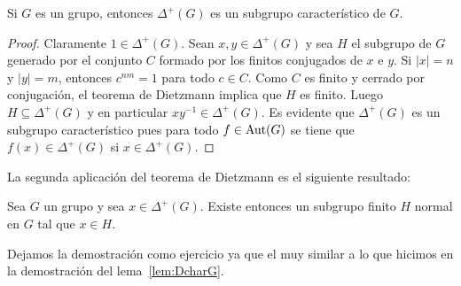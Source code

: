 \begin{lemma}
	\label{lem:DcharG}
	Si $G$ es un grupo, entonces $\Delta^+(G)$ es un subgrupo
	característico de $G$.
\end{lemma}

\begin{proof}
	Claramente $1\in\Delta^+(G)$. 
	Sean $x,y\in\Delta^+(G)$ y sea $H$ el subgrupo de $G$ generado por el
	conjunto $C$ formado por los finitos conjugados de $x$ e $y$. Si $|x|=n$ y
	$|y|=m$, entonces $c^{nm}=1$ para todo $c\in C$. Como $C$ es 
	finito y cerrado por conjugación, el teorema de Dietzmann implica que $H$ es
	finito. Luego $H\subseteq\Delta^+(G)$ y en particular $xy^{-1}\in\Delta^+(G)$.  Es
	evidente que $\Delta^+(G)$ es un subgrupo característico pues para todo
	$f\in\operatorname{Aut}(G)$ se tiene que $f(x)\in\Delta^+(G)$ si $x\in\Delta^+(G)$.
\end{proof}

La segunda aplicación del teorema de Dietzmann es el siguiente resultado:

\begin{lemma}
	\label{lem:Connel}
	Sea $G$ un grupo y sea  $x\in\Delta^+(G)$.  Existe entonces un subgrupo
	finito $H$ normal en $G$ tal que $x\in H$.
\end{lemma}

Dejamos la demostración como ejercicio ya que el muy similar a lo que hicimos
en la demostración del lema~\ref{lem:DcharG}.


